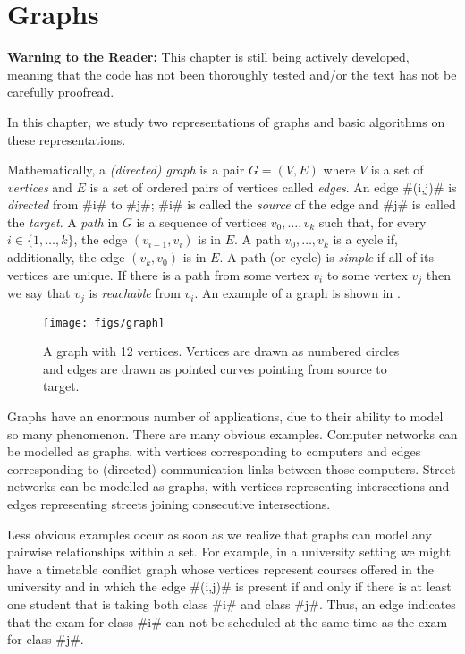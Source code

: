\chapter{Graphs}

\textbf{Warning to the Reader:} This chapter is still being actively
developed, meaning that the code has not been thoroughly tested and/or
the text has not be carefully proofread.

In this chapter, we study two representations of graphs and basic
algorithms on these representations.  

Mathematically, a \emph{(directed) graph} is a pair $G=(V,E)$ where
$V$ is a set of \emph{vertices} and $E$ is a set of ordered pairs
of vertices called \emph{edges}.  An edge #(i,j)# is \emph{directed}
from #i# to #j#;  #i# is called the \emph{source} of the edge and #j#
is called the \emph{target}.  A \emph{path} in $G$ is a sequence of
vertices $v_0,\ldots,v_k$ such that, for every $i\in\{1,\ldots,k\}$,
the edge $(v_{i-1},v_{i})$ is in $E$.  A path $v_0,\ldots,v_k$ is a
cycle if, additionally, the edge $(v_k,v_0)$ is in $E$.  A path (or
cycle) is \emph{simple} if all of its vertices are unique.  If there is
a path from some vertex $v_i$ to some vertex $v_j$ then we say that $v_j$
is \emph{reachable} from $v_i$.
An example of a graph is shown in .

\begin{figure}
  \begin{center}
    \texttt{[image: figs/graph]}
  \end{center}
  \caption{A graph with 12 vertices.  Vertices are drawn as numbered circles and edges are drawn as pointed curves pointing from source to target.}
\end{figure}


Graphs have an enormous number of applications, due to their ability
to model so many phenomenon. There are many obvious examples. Computer
networks can be modelled as graphs, with vertices corresponding to
computers and edges corresponding to (directed) communication links
between those computers.  Street networks can be modelled as graphs,
with vertices representing intersections and edges representing streets
joining consecutive intersections.

Less obvious examples occur as soon as we realize that graphs can model
any pairwise relationships within a set. For example, in a university
setting we might have a timetable conflict graph whose vertices represent
courses offered in the university and in which the edge #(i,j)# is present
if and only if there is at least one student that is taking both class
#i# and class #j#.  Thus, an edge indicates that the exam for class #i#
can not be scheduled at the same time as the exam for class #j#.

